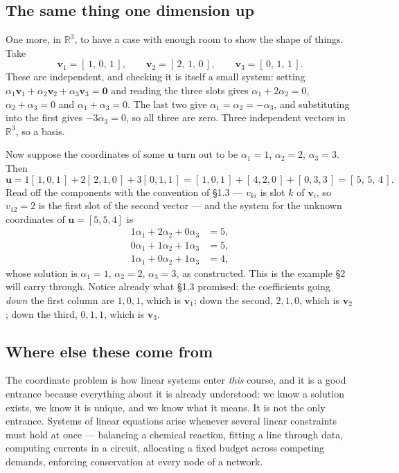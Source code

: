 \documentclass[11pt]{article}
\theoremstyle{plain}
\theoremstyle{definition}
\theoremstyle{remark}
\newcommand{\R}{\mathbb{R}}
\newcommand{\vc}[1]{\mathbf{#1}}        %
\begin{document}
\subsection{The same thing one dimension up}
One more, in $\R^{3}$, to have a case with enough room to show the shape of
things. Take
\[
  \vc{v}_1 = [\,1,\,0,\,1\,], \qquad
  \vc{v}_2 = [\,2,\,1,\,0\,], \qquad
  \vc{v}_3 = [\,0,\,1,\,1\,] .
\]
These are independent, and checking it is itself a small system: setting
$\alpha_1\vc{v}_1+\alpha_2\vc{v}_2+\alpha_3\vc{v}_3=\vc{0}$ and reading the
three slots gives $\alpha_1+2\alpha_2=0$, $\alpha_2+\alpha_3=0$ and
$\alpha_1+\alpha_3=0$. The last two give $\alpha_1=\alpha_2=-\alpha_3$, and
substituting into the first gives $-3\alpha_3=0$, so all three are zero. Three
independent vectors in $\R^{3}$, so a basis.

Now suppose the coordinates of some $\vc{u}$ turn out to be
$\alpha_1=1$, $\alpha_2=2$, $\alpha_3=3$. Then
\[
  \vc{u} = 1[\,1,0,1\,] + 2[\,2,1,0\,] + 3[\,0,1,1\,]
         = [\,1,0,1\,] + [\,4,2,0\,] + [\,0,3,3\,]
         = [\,5,\,5,\,4\,] .
\]
Read off the components with the convention of \S1.3 --- $v_{ki}$ is slot $k$ of
$\vc{v}_i$, so $v_{12}=2$ is the first slot of the second vector --- and the
system for the unknown coordinates of $\vc{u}=[5,5,4]$ is
\[
  \begin{aligned}
    1\alpha_1 + 2\alpha_2 + 0\alpha_3 &= 5 ,\\
    0\alpha_1 + 1\alpha_2 + 1\alpha_3 &= 5 ,\\
    1\alpha_1 + 0\alpha_2 + 1\alpha_3 &= 4 ,
  \end{aligned}
\]
whose solution is $\alpha_1=1$, $\alpha_2=2$, $\alpha_3=3$, as constructed. This
is the example \S2 will carry through. Notice already what \S1.3 promised: the
coefficients going \emph{down} the first column are $1,0,1$, which is $\vc{v}_1$;
down the second, $2,1,0$, which is $\vc{v}_2$; down the third, $0,1,1$, which is
$\vc{v}_3$.

\subsection{Where else these come from}
The coordinate problem is how linear systems enter \emph{this} course, and it is
a good entrance because everything about it is already understood: we know a
solution exists, we know it is unique, and we know what it means. It is not the
only entrance. Systems of linear equations arise whenever several linear
constraints must hold at once --- balancing a chemical reaction, fitting a line
through data, computing currents in a circuit, allocating a fixed budget across
competing demands, enforcing conservation at every node of a network.
\end{document}
